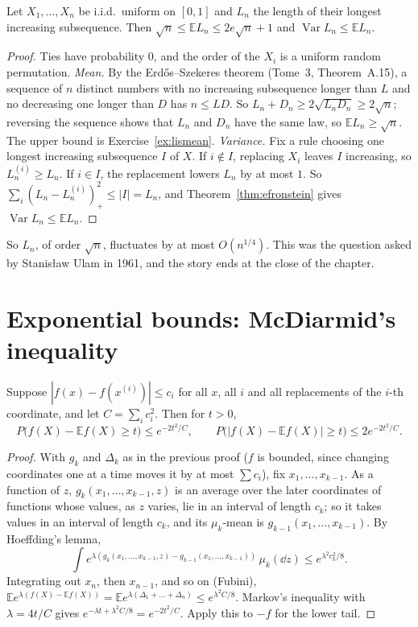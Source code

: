 \begin{proposition}\label{prop:lisvar}
Let $X_1,\dots,X_n$ be i.i.d.\ uniform on $[0,1]$ and $L_n$ the length of their longest increasing subsequence. Then $\sqrt n\le\mathbb EL_n\le2e\sqrt n+1$ and
$\operatorname{Var}L_n\le\mathbb EL_n$.
\end{proposition}
\begin{proof}
Ties have probability $0$, and the order of the $X_i$ is a uniform random permutation. \emph{Mean.} By the Erd\H os--Szekeres theorem (Tome~3, Theorem~A.15), a sequence of
$n$ distinct numbers with no increasing subsequence longer than $L$ and no decreasing one longer than $D$ has $n\le LD$. So $L_n+D_n\ge2\sqrt{L_nD_n}\ge2\sqrt n$; reversing
the sequence shows that $L_n$ and $D_n$ have the same law, so $\mathbb EL_n\ge\sqrt n$. The upper bound is Exercise~\ref{ex:lismean}.
\emph{Variance.} Fix a rule choosing one longest increasing subsequence $I$ of $X$. If $i\notin I$, replacing $X_i$ leaves $I$ increasing, so $L_n^{(i)}\ge L_n$. If $i\in I$, the
replacement lowers $L_n$ by at most $1$. So $\sum_i(L_n-L_n^{(i)})_+^2\le|I|=L_n$, and Theorem~\ref{thm:efronstein} gives $\operatorname{Var}L_n\le\mathbb EL_n$.
\end{proof}

So $L_n$, of order $\sqrt n$, fluctuates by at most $O(n^{1/4})$. This was the question asked by Stanis\l aw Ulam in 1961, and the story ends at the close of
the chapter.

\section{Exponential bounds: McDiarmid's inequality}

\begin{theorem}[McDiarmid]\label{thm:mcdiarmid}
Suppose $|f(x)-f(x^{(i)})|\le c_i$ for all $x$, all $i$ and all replacements of the $i$-th coordinate, and let $C=\sum_ic_i^2$. Then for $t>0$,
\[
P\bigl(f(X)-\mathbb Ef(X)\ge t\bigr)\le e^{-2t^2/C},\qquad P\bigl(|f(X)-\mathbb Ef(X)|\ge t\bigr)\le2e^{-2t^2/C}.
\]
\end{theorem}
\begin{proof}
With $g_k$ and $\Delta_k$ as in the previous proof ($f$ is bounded, since changing coordinates one at a time moves it by at most $\sum c_i$), fix $x_1,\dots,x_{k-1}$. As a
function of $z$, $g_k(x_1,\dots,x_{k-1},z)$ is an average over the later coordinates of functions whose values, as $z$ varies, lie in an interval of length $c_k$; so it
takes values in an interval of length $c_k$, and its $\mu_k$-mean is $g_{k-1}(x_1,\dots,x_{k-1})$. By Hoeffding's lemma,
\[
\int e^{\lambda(g_k(x_1,\dots,x_{k-1},z)-g_{k-1}(x_1,\dots,x_{k-1}))}\,\mu_k(\dd z)\le e^{\lambda^2c_k^2/8}.
\]
Integrating out $x_n$, then $x_{n-1}$, and so on (Fubini), $\mathbb Ee^{\lambda(f(X)-\mathbb Ef(X))}=\mathbb Ee^{\lambda(\Delta_1+\dots+\Delta_n)}\le e^{\lambda^2C/8}$. Markov's inequality with
$\lambda=4t/C$ gives $e^{-\lambda t+\lambda^2C/8}=e^{-2t^2/C}$. Apply this to $-f$ for the lower tail.
\end{proof}

